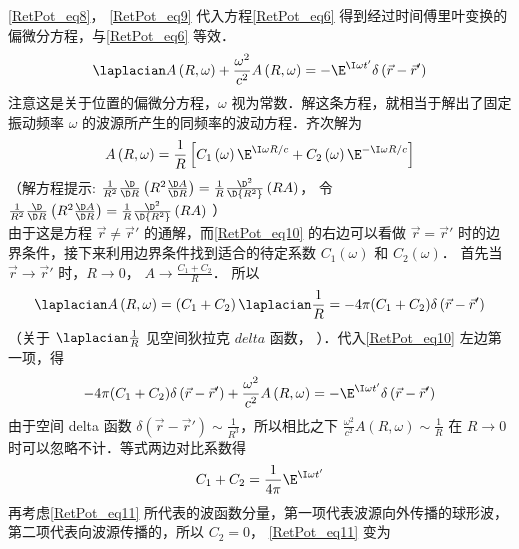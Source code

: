\autoref{RetPot_eq8}， \autoref{RetPot_eq9} 代入方程\autoref{RetPot_eq6} 得到经过时间傅里叶变换的偏微分方程，与\autoref{RetPot_eq6} 等效． 
\begin{equation}\label{RetPot_eq10}
{\laplacian}A\left( {R,\omega } \right) + \frac{{{\omega ^2}}}{{{c^2}}}A\left( {R,\omega } \right) =  - {\E^{\I\omega t'}}\delta \left( {\vec r - \vec r'} \right)
\end{equation} 
注意这是关于位置的偏微分方程，$\omega$ 视为常数．解这条方程，就相当于解出了固定振动频率 $\omega$ 的波源所产生的同频率的波动方程．齐次解为
\begin{equation}\label{RetPot_eq11}
A\left( {R,\omega } \right) = \frac{1}{R}\left[ {{C_1}\left( \omega  \right){\E^{\I\omega R/c}} + {C_2}\left( \omega  \right){\E^{ -\I\omega R/c}}} \right]
\end{equation} 
（解方程提示: $\frac{1}{{{R^2}}}\frac{\D }{{\D R}}\left( {{R^2}\frac{{\D A}}{{\D R}}} \right) = \frac{1}{R}\frac{{{\D ^2}}}{{\D {R^2}}}\left( {RA} \right)$， 令 $\frac{1}{{{R^2}}}\frac{\D }{{\D R}}\left( {{R^2}\frac{{\D A}}{{\D R}}} \right) = \frac{1}{R}\frac{{{\D ^2}}}{{\D {R^2}}}\left( {RA} \right)$ ）\\
由于这是方程 $\vec r \ne \vec r'$ 的通解，而\autoref{RetPot_eq10} 的右边可以看做 $\vec r = \vec r'$ 时的边界条件，接下来利用边界条件找到适合的待定系数 ${C_1}\left( \omega  \right)$ 和 ${C_2}\left( \omega  \right)$．  
首先当 $\vec r \to \vec r'$ 时，$R \to 0$， $A \to \frac{{{C_1} + {C_2}}}{R}$． 所以
\begin{equation}
{\laplacian}A\left( {R,\omega } \right) = \left( {{C_1} + {C_2}} \right){\laplacian}\frac{1}{R} =  - 4\pi ({C_1} + {C_2})\delta \left( {\vec r - \vec r'} \right)
\end{equation} 
（关于 ${\laplacian}\frac{1}{R}$ 见空间狄拉克 $delta$ 函数，%
）．代入\autoref{RetPot_eq10} 左边第一项，得
\begin{equation}
 - 4\pi ({C_1} + {C_2})\delta \left( {\vec r - \vec r'} \right) + \frac{{{\omega ^2}}}{{{c^2}}}A\left( {R,\omega } \right) =  - {\E^{\I\omega t'}}\delta \left( {\vec r - \vec r'} \right)
\end{equation} 
由于空间 delta 函数 $\delta \left( {\vec r - \vec r'} \right) \sim \frac{1}{{{R^3}}}$，所以相比之下 $\frac{{{\omega ^2}}}{{{c^2}}}A\left( {R,\omega } \right) \sim \frac{1}{R}$ 在 $R \to 0$ 时可以忽略不计．等式两边对比系数得
\begin{equation}
{C_1} + {C_2} = \frac{1}{{4\pi }}{\E^{\I\omega t'}}
\end{equation} 
再考虑\autoref{RetPot_eq11} 所代表的波函数分量，第一项代表波源向外传播的球形波，第二项代表向波源传播的，所以 ${C_2} = 0$， \autoref{RetPot_eq11} 变为
